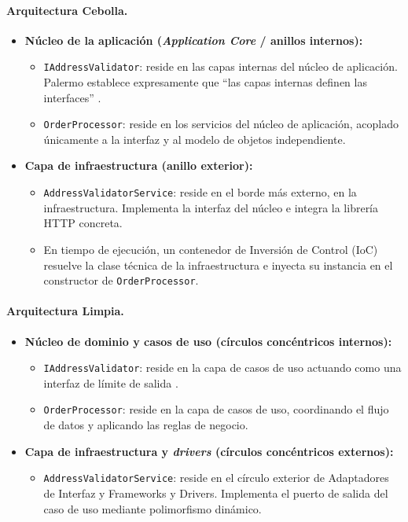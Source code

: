 \paragraph{Arquitectura Cebolla.}
\begin{itemize}
    \item \textbf{Núcleo de la aplicación (\emph{Application Core} / anillos internos):}
    \begin{itemize}
        \item \texttt{IAddressValidator}: reside en las capas internas del núcleo de aplicación. Palermo establece expresamente que \enquote{las capas internas definen las interfaces} \parencite{palermo2008}.
        \item \texttt{OrderProcessor}: reside en los servicios del núcleo de aplicación, acoplado únicamente a la interfaz y al modelo de objetos independiente.
    \end{itemize}
    \item \textbf{Capa de infraestructura (anillo exterior):}
    \begin{itemize}
        \item \texttt{AddressValidatorService}: reside en el borde más externo, en la infraestructura. Implementa la interfaz del núcleo e integra la librería HTTP concreta.
        \item En tiempo de ejecución, un contenedor de Inversión de Control (IoC) resuelve la clase técnica de la infraestructura e inyecta su instancia en el constructor de \texttt{OrderProcessor}.
    \end{itemize}
\end{itemize}

\paragraph{Arquitectura Limpia.}
\begin{itemize}
    \item \textbf{Núcleo de dominio y casos de uso (círculos concéntricos internos):}
    \begin{itemize}
        \item \texttt{IAddressValidator}: reside en la capa de casos de uso actuando como una interfaz de límite de salida \parencite{martin2017}.
        \item \texttt{OrderProcessor}: reside en la capa de casos de uso, coordinando el flujo de datos y aplicando las reglas de negocio.
    \end{itemize}
    \item \textbf{Capa de infraestructura y \emph{drivers} (círculos concéntricos externos):}
    \begin{itemize}
        \item \texttt{AddressValidatorService}: reside en el círculo exterior de Adaptadores de Interfaz y Frameworks y Drivers. Implementa el puerto de salida del caso de uso mediante polimorfismo dinámico.
    \end{itemize}
\end{itemize}

